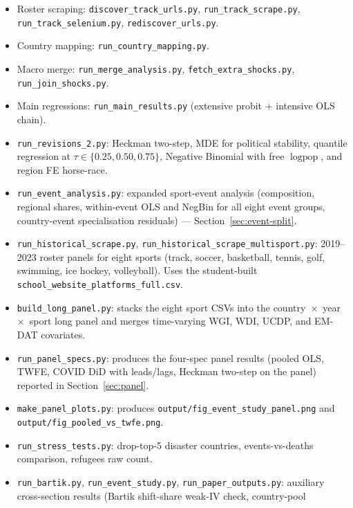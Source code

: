 \documentclass[11pt]{article}
\begin{document}
\begin{itemize}
\item Roster scraping: \texttt{discover\_track\_urls.py},
      \texttt{run\_track\_scrape.py},
      \texttt{run\_track\_selenium.py},
      \texttt{rediscover\_urls.py}.
\item Country mapping: \texttt{run\_country\_mapping.py}.
\item Macro merge: \texttt{run\_merge\_analysis.py},
      \texttt{fetch\_extra\_shocks.py},
      \texttt{run\_join\_shocks.py}.
\item Main regressions: \texttt{run\_main\_results.py}
      (extensive probit + intensive OLS chain).
\item \texttt{run\_revisions\_2.py}: Heckman two-step, MDE for
      political stability, quantile regression at
      $\tau \in \{0.25, 0.50, 0.75\}$, Negative Binomial with free
      $\log\text{pop}$, and region FE horse-race.
\item \texttt{run\_event\_analysis.py}: expanded sport-event
      analysis (composition, regional shares, within-event OLS and
      NegBin for all eight event groups, country-event
      specialisation residuals) --- Section~\ref{sec:event-split}.
\item \texttt{run\_historical\_scrape.py},
      \texttt{run\_historical\_scrape\_multisport.py}: 2019--2023
      roster panels for eight sports (track, soccer, basketball,
      tennis, golf, swimming, ice hockey, volleyball). Uses the
      student-built \texttt{school\_website\_platforms\_full.csv}.
\item \texttt{build\_long\_panel.py}: stacks the eight sport CSVs
      into the country~$\times$~year~$\times$~sport long panel and
      merges time-varying WGI, WDI, UCDP, and EM-DAT covariates.
\item \texttt{run\_panel\_specs.py}: produces the four-spec panel
      results (pooled OLS, TWFE, COVID DiD with leads/lags, Heckman
      two-step on the panel) reported in
      Section~\ref{sec:panel}.
\item \texttt{make\_panel\_plots.py}: produces
      \texttt{output/fig\_event\_study\_panel.png} and
      \texttt{output/fig\_pooled\_vs\_twfe.png}.
\item \texttt{run\_stress\_tests.py}: drop-top-5 disaster countries,
      events-vs-deaths comparison, refugees raw count.
\item \texttt{run\_bartik.py}, \texttt{run\_event\_study.py},
      \texttt{run\_paper\_outputs.py}: auxiliary cross-section
      results (Bartik shift-share weak-IV check, country-pool

\end{itemize}
\end{document}
